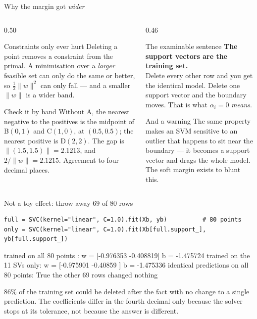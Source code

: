 \documentclass[aspectratio=169]{beamer}
\begin{document}
\begin{frame}[shrink=6]{Why the margin got \emph{wider}}
  \begin{columns}[T]
    \begin{column}{0.50\textwidth}
      \begin{block}{Constraints only ever hurt}
        Deleting a point removes a constraint from the primal. A minimisation
        over a \emph{larger} feasible set can only do the same or better, so
        $\tfrac12\|w\|^2$ can only fall --- and a smaller $\|w\|$ is a wider
        band.
      \end{block}
      \begin{exampleblock}{Check it by hand}
        Without A, the nearest negative to the positives is the midpoint of
        B$(0,1)$ and C$(1,0)$, at $(0.5,0.5)$; the nearest positive is
        D$(2,2)$. The gap is $\|(1.5,1.5)\| = 2.1213$, and
        $2/\|w\| = 2.1215$. Agreement to four decimal places.
      \end{exampleblock}
    \end{column}
    \begin{column}{0.46\textwidth}
      \begin{alertblock}{The examinable sentence}
        \centering
        \textbf{The support vectors are the training set.}\\[0.4em]
        \normalsize Delete every other row and you get the identical model.
        Delete one support vector and the boundary moves. That is what
        $\alpha_i = 0$ \emph{means}.
      \end{alertblock}
      \begin{block}{And a warning}
        The same property makes an SVM sensitive to an outlier that happens
        to sit near the boundary --- it becomes a support vector and drags
        the whole model. The soft margin exists to blunt this.
      \end{block}
    \end{column}
  \end{columns}
\end{frame}

\begin{frame}[fragile,shrink=4]{Not a toy effect: throw away $69$ of $80$ rows}
\begin{lstlisting}
full = SVC(kernel="linear", C=1.0).fit(Xb, yb)          # 80 points
only = SVC(kernel="linear", C=1.0).fit(Xb[full.support_], yb[full.support_])
\end{lstlisting}
\begin{outblk}
trained on all 80 points : w = [-0.976353 -0.408819]  b = -1.475724
trained on the 11 SVs only: w = [-0.975901 -0.40859 ]  b = -1.475336
identical predictions on all 80 points: True
the other 69 rows changed nothing
\end{outblk}
  \begin{center}\small
    $86\%$ of the training set could be deleted after the fact with no change
    to a single prediction. The coefficients differ in the fourth decimal
    only because the solver stops at its tolerance, not because the answer is
    different.
  \end{center}
\end{frame}
\end{document}

